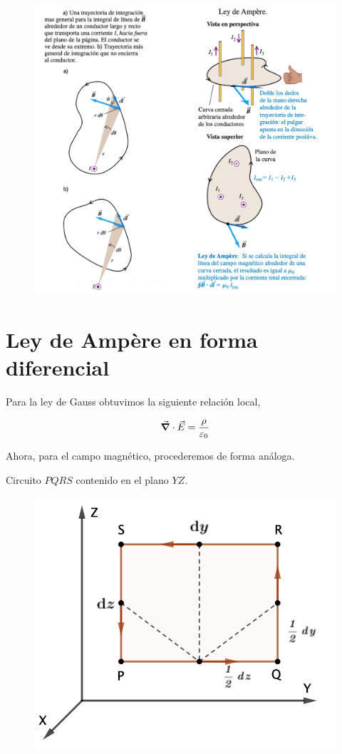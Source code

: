 \begin{figure}[H]
	\centering
	\includegraphics[width=1\textwidth]{imagenes/imagenes27/T27IM06.png}
\end{figure}


\section{Ley de Ampère en forma diferencial}

\begin{multicols}{2}
Para la ley de Gauss obtuvimos la siguiente relación local, 

$$ \vec \grad  \cdot \vec E = \dfrac{\rho}{\varepsilon_0}$$ 

Ahora, para el campo magnético, procederemos de forma análoga.


Circuito $PQRS$ contenido en el plano $YZ$.
\begin{figure}[H]
	\centering
	\includegraphics[width=.5\textwidth]{imagenes/imagenes27/T27IM08.png}
\end{figure}	
\end{multicols}

